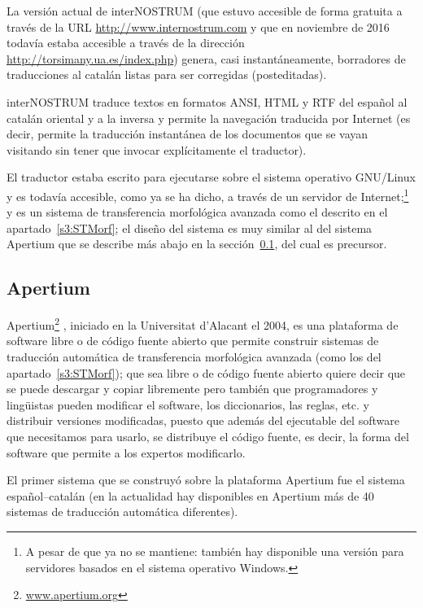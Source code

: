 {La versión actual de {\sf interNOSTRUM} (que estuvo accesible de forma gratuita a través de la URL \url{http://www.internostrum.com} y que en noviembre de 2016 todavía estaba accesible a través de la dirección \url{http://torsimany.ua.es/index.php}) genera, casi instantáneamente, borradores de traducciones al catalán listas para ser corregidas (posteditadas). 

{\sf interNOSTRUM} traduce textos en formatos ANSI, HTML y RTF del español al catalán oriental y a la inversa y permite la navegación traducida por Internet (es decir, permite la traducción instantánea de los documentos que se vayan visitando sin tener que invocar explícitamente el traductor). 

El traductor estaba escrito para ejecutarse sobre el sistema operativo GNU/\-Linux y es todavía accesible, como ya se ha dicho, a través de un servidor de Internet;\footnote{A pesar de que ya no se mantiene: también hay disponible una versión para servidores basados en el sistema operativo Windows.} y es un sistema de transferencia morfológica avanzada como el descrito en el apartado~\ref{s3:STMorf}; el diseño del sistema es muy similar al del sistema Apertium que se describe más abajo en la sección~\ref{ss:apertium}, del cual es precursor. 

\subsection{Apertium} \label{ss:apertium} 

Apertium\footnote{\url{www.apertium.org}} \citep{forcada2011apertium}, iniciado en la Universitat d'Alacant el 2004, es una plataforma de software libre o de código fuente abierto que permite construir sistemas de traducción automática de transferencia morfológica avanzada (como los del apartado~\ref{s3:STMorf}); que sea libre o de código fuente abierto quiere decir que se puede descargar y copiar libremente pero también que programadores y lingüistas pueden modificar el software, los diccionarios, las reglas, etc. y distribuir versiones modificadas, puesto que además del ejecutable del software que necesitamos para usarlo, se  distribuye el código fuente, es decir, la forma del software que permite a los expertos modificarlo. 

El primer sistema que se construyó sobre la plataforma Apertium fue el sistema español--catalán (en la actualidad hay disponibles en Apertium más de 40 sistemas de traducción automática diferentes). 

}
